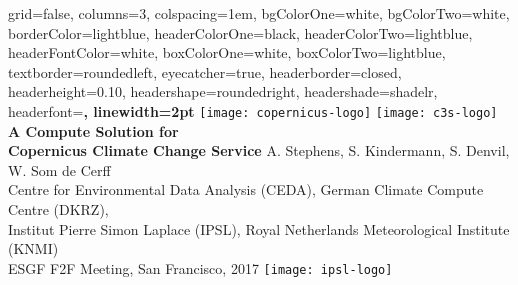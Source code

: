 \documentclass[portrait,a0paper,fontscale=0.4]{baposter} %
\begin{document}


\begin{poster}%
  {
  grid=false,
  columns=3,
  colspacing=1em,
  bgColorOne=white, %
  bgColorTwo=white, %
  borderColor=lightblue, %
  headerColorOne=black, %
  headerColorTwo=lightblue, %
  headerFontColor=white, %
  boxColorOne=white, %
  boxColorTwo=lightblue,
  textborder=roundedleft,
  eyecatcher=true, %
  headerborder=closed, %
  headerheight=0.10\textheight, %
  headershape=roundedright, %
  headershade=shadelr,
  headerfont=\Large\bf\textsc, %
  linewidth=2pt
  }
  {
      \texttt{[image: copernicus-logo]}
      \texttt{[image: c3s-logo]}
  }
  {\sf\bf
          A Compute Solution for\\ Copernicus Climate Change Service
  }
  {
    \vspace{1em} A. Stephens, S. Kindermann, S. Denvil, W. Som de Cerff\\
    {\smaller Centre for Environmental Data Analysis (CEDA),
    German Climate Compute Centre (DKRZ),\\
    Institut Pierre Simon Laplace (IPSL),
    Royal Netherlands Meteorological Institute (KNMI)\\[1em]
    ESGF F2F Meeting, San Francisco, 2017}
  }
  {
    \texttt{[image: ipsl-logo]}
  }


\end{poster}
\end{document}

